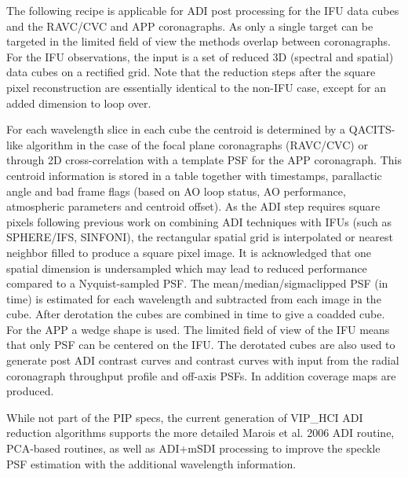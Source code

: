 The following recipe is applicable for ADI post processing for the IFU
data cubes and the RAVC/CVC and APP coronagraphs. As only a single
target can be targeted in the limited field of view the methods
overlap between coronagraphs.  For the IFU observations, the input is
a set of reduced 3D (spectral and spatial) data cubes on a rectified
grid. Note that the reduction steps after the square pixel reconstruction
are essentially identical to the non-IFU case, except for an added dimension
to loop over. 

For each wavelength slice in each cube the centroid is determined by a
QACITS-like algorithm in the case of the focal plane coronagraphs
(RAVC/CVC) or through 2D cross-correlation with a template PSF for the
APP coronagraph. This centroid information is stored in a table
together with timestamps, parallactic angle and bad frame flags (based
on AO loop status, AO performance, atmospheric parameters and centroid
offset).  As the ADI step requires square pixels following previous
work on combining ADI techniques with IFUs (such as SPHERE/IFS,
SINFONI), the rectangular spatial grid is interpolated or nearest
neighbor filled to produce a square pixel image.  It is acknowledged
that one spatial dimension is undersampled which may lead to reduced
performance compared to a Nyquist-sampled PSF.  The
mean/median/sigmaclipped PSF (in time) is estimated for each
wavelength and subtracted from each image in the cube.  After
derotation the cubes are combined in time to give a coadded cube. For
the APP a wedge shape is used. The limited field of view of the IFU
means that only PSF can be centered on the IFU. The derotated cubes
are also used to generate post ADI contrast curves and contrast curves
with input from the radial coronagraph throughput profile and off-axis
PSFs. In addition coverage maps are produced.

While not part of the PIP specs, the current generation of VIP\_HCI
ADI reduction algorithms supports the more detailed Marois et al. 2006
ADI routine, PCA-based routines, as well as ADI+mSDI processing to
improve the speckle PSF estimation with the additional wavelength
information.



